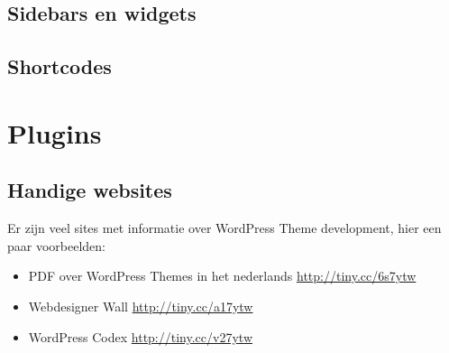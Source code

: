\documentclass[8pt,pagesize,footinclude=false,headinclude=false]{scrartcl}
\begin{document}
\begin{multicols*}{4}
\subsection*{Sidebars en widgets}

\subsection*{Shortcodes}

\clearpage

\section*{Plugins}

\clearpage

\subsection*{Handige websites}
Er zijn veel sites met informatie over WordPress Theme development, hier een paar voorbeelden:
\begin{itemize}
	\item PDF over WordPress Themes in het nederlands \url{http://tiny.cc/6s7ytw}
	\item Webdesigner Wall \url{http://tiny.cc/a17ytw}
	\item WordPress Codex \url{http://tiny.cc/v27ytw}
\end{itemize}

\end{multicols*}
\end{document}

